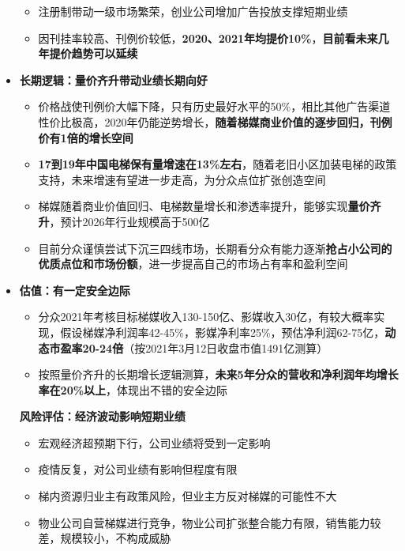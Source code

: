\begin{itemize}[leftmargin=*]
{\begin{itemize}
        \item 注册制带动一级市场繁荣，创业公司增加广告投放支撑短期业绩
        \item 因刊挂率较高、刊例价较低，\textbf{2020、2021年均提价10\%}，\textbf{目前看未来几年提价趋势可以延续}
      \end{itemize}
      }
    \item
      \textbf{长期逻辑：量价齐升带动业绩长期向好}
      {\small
      \begin{itemize}
        \item 价格战使刊例价大幅下降，只有历史最好水平的50\%，相比其他广告渠道性价比极高，2020年仍能逆势增长，\textbf{随着梯媒商业价值的逐步回归，刊例价有1倍的增长空间}
        \item \textbf{17到19年中国电梯保有量增速在13\%左右}，随着老旧小区加装电梯的政策支持，未来增速有望进一步走高，为分众点位扩张创造空间
        \item 梯媒随着商业价值回归、电梯数量增长和渗透率提升，能够实现\textbf{量价齐升}，预计2026年行业规模高于500亿
        \item 目前分众谨慎尝试下沉三四线市场，长期看分众有能力逐渐\textbf{抢占小公司的优质点位和市场份额}，进一步提高自己的市场占有率和盈利空间
      \end{itemize}
      }
      \item
      \textbf{估值：有一定安全边际}
      {\small
      \begin{itemize}
        \item 分众2021年考核目标梯媒收入130-150亿、影媒收入30亿，有较大概率实现，假设梯媒净利润率42-45\%，影媒净利率25\%，预估净利润62-75亿，\textbf{动态市盈率20-24倍}（按2021年3月12日收盘市值1491亿测算）
        \item 按照量价齐升的长期增长逻辑测算，\textbf{未来5年分众的营收和净利润年均增长率在20\%以上}，体现出不错的安全边际
      \end{itemize}
      }
      \textbf{风险评估：经济波动影响短期业绩}
      {\small
      \begin{itemize}
        \item 宏观经济超预期下行，公司业绩将受到一定影响
        \item 疫情反复，对公司业绩有影响但程度有限
        \item 梯内资源归业主有政策风险，但业主方反对梯媒的可能性不大
        \item 物业公司自营梯媒进行竞争，物业公司扩张整合能力有限，销售能力较差，规模较小，不构成威胁
      \end{itemize}
      }
  \end{itemize}